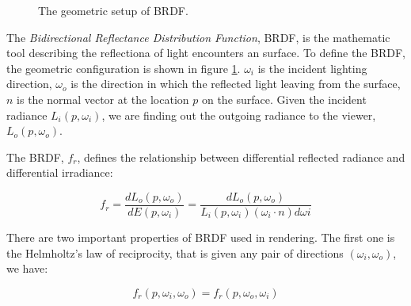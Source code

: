 \begin{figure}[htp] 
    \centering 
    \renewcommand{\thefigure}{\thechapter.\arabic{figure}}
    \caption[]{The geometric setup of BRDF. }
    \label{fig:brdf} 
\end{figure} 

The \emph{Bidirectional Reflectance Distribution Function}, BRDF, is the mathematic tool describing the reflectiona of light encounters an surface. To define the BRDF, the geometric configuration is shown in figure \ref{fig:brdf}. \(\omega_{i}\) is the incident lighting direction, \(\omega_{o}\) is the direction in which the reflected light leaving from the surface, \(n\) is the normal vector at the location \(p\) on the surface. Given the incident radiance \(L_{i}(p, \omega_{i})\), we are finding out the outgoing radiance to the viewer, \(L_{o}(p, \omega_{o})\). 

The BRDF, \(f_{r}\), defines the relationship between differential reflected radiance and differential irradiance: 

\begin{equation}
f_{r} = \frac{dL_{o}(p, \omega_{o})}{dE(p, \omega_{i})} = \frac{dL_{o}(p, \omega_{o})}{L_{i}(p, \omega_{i})(\omega_{i} \cdot n)d\omega{i}}
\label{eq:brdf}
\end{equation} 

There are two important properties of BRDF used in rendering. The first one is the Helmholtz's law of reciprocity, that is given any pair of directions \( (\omega_{i}, \omega_{o} ) \), we have: 

\begin{equation}
f_{r}(p, \omega_{i}, \omega_{o}) = f_r(p, \omega_{o}, \omega_{i})
\end{equation}

